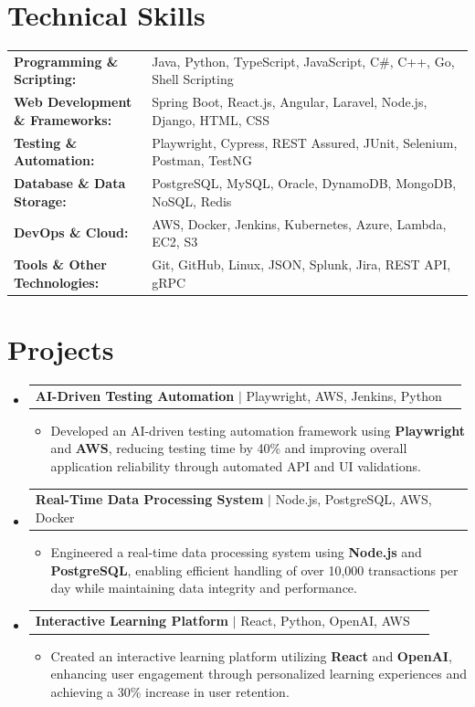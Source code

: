 \documentclass[letterpaper,10pt]{article}
\makeatletter
\newcommand{\resumeItem}[1]{
  \item{\fontsize{8pt}{9pt}\selectfont
    #1 \vspace{-3pt}
  }
}
\newcommand{\resumeProjectHeading}[2]{
    \item
    \begin{tabular*}{1.001\textwidth}{l@{\extracolsep{\fill}}r}
      \fontsize{8.5pt}{10pt}#1 & \textbf{\fontsize{8.5pt}{10pt} #2}\\
    \end{tabular*}\vspace{-7pt}
}
\newcommand{\resumeSubHeadingListStart}{\begin{itemize}[leftmargin=0pt, label={}]}
\newcommand{\resumeSubHeadingListEnd}{\end{itemize}}
\newcommand{\resumeItemListStart}{\begin{itemize}[leftmargin=*]}
\newcommand{\resumeItemListEnd}{\end{itemize}\vspace{-5pt}}
\makeatother
\begin{document}
\section{Technical Skills}
        \vspace{-14pt}
        \begin{table}[h]
            \fontsize{8pt}{9pt}\selectfont
            \begin{tabular}{p{0.3\linewidth} p{0.7\linewidth}}
                \textbf{Programming \& Scripting:} & Java, Python, TypeScript, JavaScript, C\#, C++, Go, Shell Scripting \\
                \textbf{Web Development \& Frameworks:} & Spring Boot, React.js, Angular, Laravel, Node.js, Django, HTML, CSS \\
                \textbf{Testing \& Automation:} & Playwright, Cypress, REST Assured, JUnit, Selenium, Postman, TestNG \\
                \textbf{Database \& Data Storage:} & PostgreSQL, MySQL, Oracle, DynamoDB, MongoDB, NoSQL, Redis \\
                \textbf{DevOps \& Cloud:} & AWS, Docker, Jenkins, Kubernetes, Azure, Lambda, EC2, S3 \\
                \textbf{Tools \& Other Technologies:} & Git, GitHub, Linux, JSON, Splunk, Jira, REST API, gRPC \\
            \end{tabular}
        \end{table}
 \vspace{-18pt}

\section{Projects}
    \vspace{-5pt}
    \resumeSubHeadingListStart
          \resumeProjectHeading
            {\textbf{AI-Driven Testing Automation} $|$ Playwright, AWS, Jenkins, Python}{}
            \resumeItemListStart
                \resumeItem{Developed an AI-driven testing automation framework using \textbf{Playwright} and \textbf{AWS}, reducing testing time by 40\% and improving overall application reliability through automated API and UI validations.}
            \resumeItemListEnd
        \vspace{-12pt}
    
        \resumeProjectHeading
            {\textbf{Real-Time Data Processing System} $|$ Node.js, PostgreSQL, AWS, Docker}{}
        \resumeItemListStart
                \resumeItem{Engineered a real-time data processing system using \textbf{Node.js} and \textbf{PostgreSQL}, enabling efficient handling of over 10,000 transactions per day while maintaining data integrity and performance.}
        \resumeItemListEnd
      \vspace{-12pt}
      \resumeProjectHeading
        {\textbf{Interactive Learning Platform} $|$ React, Python, OpenAI, AWS}{}
    \resumeItemListStart
            \resumeItem{Created an interactive learning platform utilizing \textbf{React} and \textbf{OpenAI}, enhancing user engagement through personalized learning experiences and achieving a 30\% increase in user retention.}
    \resumeItemListEnd
    \resumeSubHeadingListEnd
\end{document}
